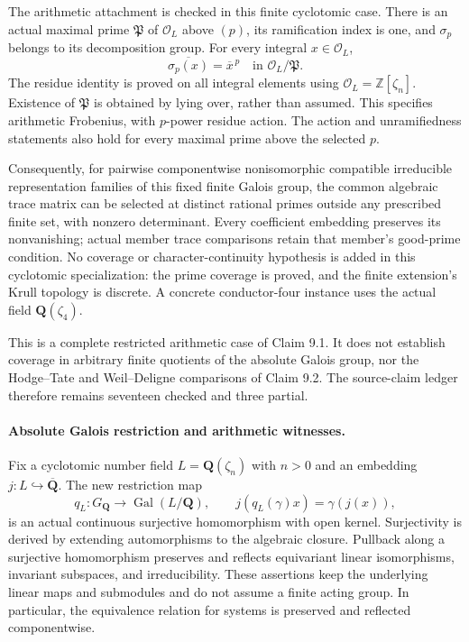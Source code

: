 \documentclass[11pt]{article}
\theoremstyle{definition}
\theoremstyle{remark}
\newcommand{\Q}{\mathbf Q}
\begin{document}
The arithmetic attachment is checked in this finite cyclotomic case. There is
an actual maximal prime $\mathfrak P$ of $\mathcal O_L$ above $(p)$, its
ramification index is one, and $\sigma_p$ belongs to its decomposition group.
For every integral $x\in\mathcal O_L$,
\[
 \overline{\sigma_p(x)}=\overline{x}^{\,p}
 \quad\text{in }\mathcal O_L/\mathfrak P.
\]
The residue identity is proved on all integral elements using
$\mathcal O_L=\mathbb Z[\zeta_n]$. Existence of $\mathfrak P$ is obtained by
lying over, rather than assumed. This specifies arithmetic Frobenius, with
$p$-power residue action. The action and unramifiedness statements also hold
for every maximal prime above the selected $p$.

Consequently, for pairwise componentwise nonisomorphic compatible irreducible
representation families of this fixed finite Galois group, the common algebraic
trace matrix can be selected at distinct rational primes outside any prescribed
finite set, with nonzero determinant. Every coefficient embedding preserves its
nonvanishing; actual member trace comparisons retain that member's good-prime
condition. No coverage or character-continuity hypothesis is added in this
cyclotomic specialization: the prime coverage is proved, and the finite
extension's Krull topology is discrete. A concrete conductor-four instance uses
the actual field $\Q(\zeta_4)$.

This is a complete restricted arithmetic case of Claim 9.1. It does not establish
coverage in arbitrary finite quotients of the absolute Galois group, nor the
Hodge--Tate and Weil--Deligne comparisons of Claim 9.2. The source-claim ledger
therefore remains seventeen checked and three partial.

\paragraph{Absolute Galois restriction and arithmetic witnesses.}\label{book:x-construction-26}
Fix a cyclotomic number field $L=\Q(\zeta_n)$ with $n>0$ and an embedding
$j:L\hookrightarrow\overline{\Q}$. The new restriction map
\[
 q_L:G_{\Q}\longrightarrow\operatorname{Gal}(L/\Q),\qquad
 j(q_L(\gamma)x)=\gamma(j(x)),
\]
is an actual continuous surjective homomorphism with open kernel. Surjectivity
is derived by extending automorphisms to the algebraic closure. Pullback along
a surjective homomorphism preserves and reflects equivariant linear
isomorphisms, invariant subspaces, and irreducibility. These assertions keep
the underlying linear maps and submodules and do not assume a finite acting
group. In particular, the equivalence relation for systems is preserved and
reflected componentwise.
\end{document}
